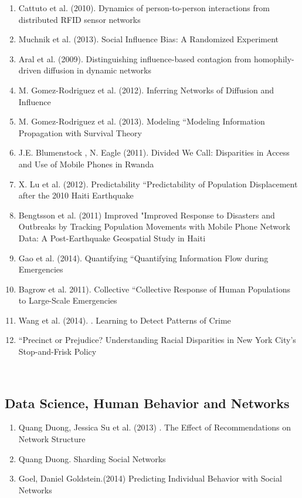 \begin{enumerate}
\item Cattuto et al. (2010).  Dynamics of person-to-person interactions from distributed RFID sensor networks\cite{Cattuto_2010}   
\item Muchnik et al. (2013).  Social Influence Bias: A Randomized Experiment\cite{Muchnik_2013}  
\item Aral et al. (2009).  Distinguishing influence-based contagion from homophily-driven diffusion in dynamic networks\cite{Aral_2009}   
\item M. Gomez-Rodriguez et al. (2012).  Inferring Networks of Diffusion and Influence\cite{Gomez_Rodriguez_2012}   
\item  M. Gomez-Rodriguez et al. (2013). Modeling “Modeling  Information Propagation with Survival Theory\cite{rodriguez2013modeling} 
\item J.E. Blumenstock , N. Eagle (2011).  Divided We Call: Disparities in Access and Use of Mobile Phones in Rwanda\cite{blumenstock2012divided}   
\item  X. Lu et al. (2012). Predictability “Predictability  of Population Displacement after the 2010 Haiti Earthquake\cite{Lu_2012}   
\item  Bengtsson et al. (2011) Improved "Improved  Response to Disasters and Outbreaks by Tracking Population Movements with Mobile Phone Network Data: A Post-Earthquake Geospatial Study in Haiti\cite{Bengtsson_2011}  
\item  Gao et al. (2014). Quantifying “Quantifying  Information Flow during Emergencies\cite{Gao_2014}   
\item  Bagrow et al. 2011). Collective “Collective  Response of Human Populations to Large-Scale Emergencies\cite{Bagrow_2011}  \item  Wang et al. (2014). .  Learning to Detect Patterns of Crime\cite{Wang_2013}   
\item  “Precinct or Prejudice? Understanding Racial Disparities in New York City’s Stop-and-Frisk Policy  
\end{enumerate}  
\\  \subsection{Data Science, Human Behavior and Networks}  
\begin{enumerate}  
\item  Quang Duong, Jessica Su  et al. (2013) . The Effect of Recommendations on Network Structure   
\item  Quang Duong.  Sharding Social Networks\cite{Duong_2013}   
\item  Goel, Daniel  Goldstein.(2014)  Predicting Individual Behavior with Social Networks \cite{Goel_2014} 


\end{enumerate}  
\\  
